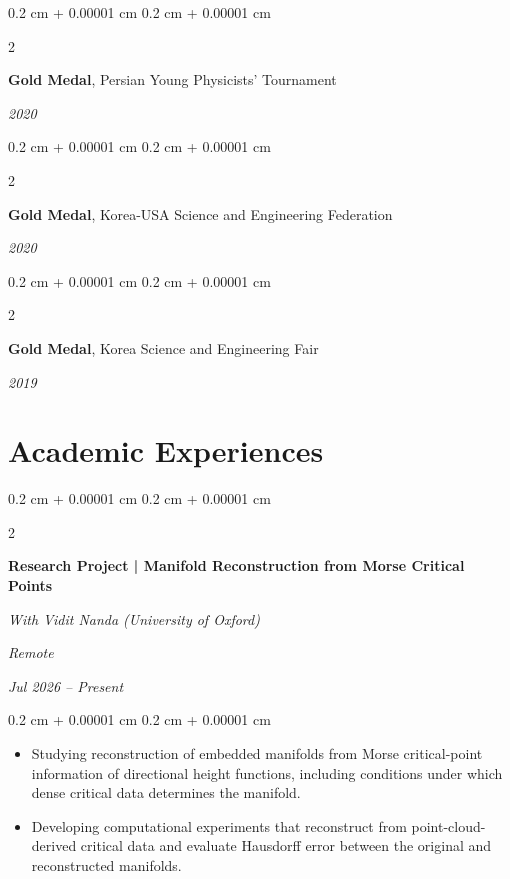 \documentclass[10pt, letterpaper]{article}
\newenvironment{highlights}{
    \begin{itemize}[
        topsep=0.05 cm,
        parsep=0.04 cm,
        partopsep=0pt,
        itemsep=0pt,
        leftmargin=0.4 cm + 10pt
    ]
}{
    \end{itemize}
} %
\newenvironment{onecolentry}{
    \begin{adjustwidth}{
        0.2 cm + 0.00001 cm
    }{
        0.2 cm + 0.00001 cm
    }
}{
    \end{adjustwidth}
} %
\newenvironment{twocolentry}[2][]{
    \onecolentry
    \def\secondColumn{#2}
    \setcolumnwidth{\fill, 4.5 cm}
    \begin{paracol}{2}
}{
    \switchcolumn \raggedleft \secondColumn
    \end{paracol}
    \endonecolentry
} %
\begin{document}
        \vspace{0.2 cm}
        
        \begin{twocolentry}{  
            \textit{2020}}
            \textbf{Gold Medal}, Persian Young Physicists' Tournament
        \end{twocolentry}
        
        \vspace{0.2 cm}
        
        \begin{twocolentry}{  
            \textit{2020}}
            \textbf{Gold Medal}, Korea-USA Science and Engineering Federation
        \end{twocolentry}
        
        \vspace{0.2 cm}
        
        \begin{twocolentry}{  
            \textit{2019}}
            \textbf{Gold Medal}, Korea Science and Engineering Fair
        \end{twocolentry}

    \section{Academic Experiences}

        \begin{twocolentry}{
            \textit{Remote}

            \textit{Jul 2026 -- Present}}
            \textbf{Research Project | Manifold Reconstruction from Morse Critical Points}

            \textit{With Vidit Nanda (University of Oxford)}
        \end{twocolentry}

        \vspace{0.08 cm}
        \begin{onecolentry}
            \begin{highlights}
                \item Studying reconstruction of embedded manifolds from Morse critical-point information of directional height functions, including conditions under which dense critical data determines the manifold.
                \item Developing computational experiments that reconstruct from point-cloud-derived critical data and evaluate Hausdorff error between the original and reconstructed manifolds.
            \end{highlights}
        \end{onecolentry}
\end{document}
